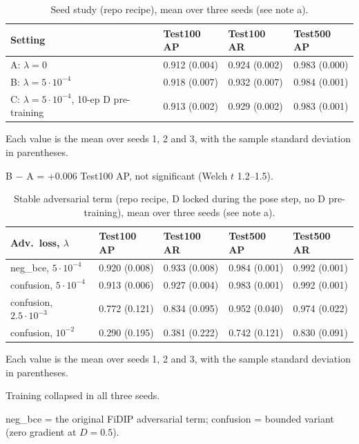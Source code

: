 \documentclass[10pt]{article}
\begin{document}
\begin{table}[h]\centering\small
\begin{threeparttable}
\caption{Seed study (repo recipe), mean over three seeds (see note a).}
\begin{tabularx}{\linewidth}{X l l l}
\toprule
Setting & Test100 AP & Test100 AR & Test500 AP \\
\midrule
A: $\lambda=0$ & 0.912 (0.004) & 0.924 (0.002) & 0.983 (0.000) \\
B: $\lambda=5\cdot10^{-4}$ & 0.918 (0.007) & 0.932 (0.007) & 0.984 (0.001) \\
C: $\lambda=5\cdot10^{-4}$, 10-ep D pre-training & 0.913 (0.002) & 0.929 (0.002) & 0.983 (0.001) \\
\bottomrule
\end{tabularx}
\begin{tablenotes}\footnotesize
\item[a] Each value is the mean over seeds 1, 2 and 3, with the sample standard deviation in parentheses.
\item B $-$ A = +0.006 Test100 AP, not significant (Welch $t$ 1.2--1.5).
\end{tablenotes}
\end{threeparttable}
\end{table}

\begin{table}[h]\centering\small
\begin{threeparttable}
\caption{Stable adversarial term (repo recipe, D locked during the pose step, no D pre-training), mean over three seeds (see note a).}
\begin{tabularx}{\linewidth}{X l l l l}
\toprule
Adv.\ loss, $\lambda$ & Test100 AP & Test100 AR & Test500 AP & Test500 AR \\
\midrule
neg\_bce, $5\cdot10^{-4}$ & 0.920 (0.008) & 0.933 (0.008) & 0.984 (0.001) & 0.992 (0.001) \\
confusion, $5\cdot10^{-4}$ & 0.913 (0.006) & 0.927 (0.004) & 0.983 (0.001) & 0.992 (0.001) \\
confusion, $2.5\cdot10^{-3}$ & 0.772 (0.121) & 0.834 (0.095) & 0.952 (0.040) & 0.974 (0.022) \\
confusion, $10^{-2}$ & 0.290 (0.195)\tnote{b} & 0.381 (0.222) & 0.742 (0.121) & 0.830 (0.091) \\
\bottomrule
\end{tabularx}
\begin{tablenotes}\footnotesize
\item[a] Each value is the mean over seeds 1, 2 and 3, with the sample standard deviation in parentheses.
\item[b] Training collapsed in all three seeds.
\item neg\_bce = the original FiDIP adversarial term; confusion = bounded variant (zero gradient at $D=0.5$).
\end{tablenotes}
\end{threeparttable}
\end{table}
\end{document}
